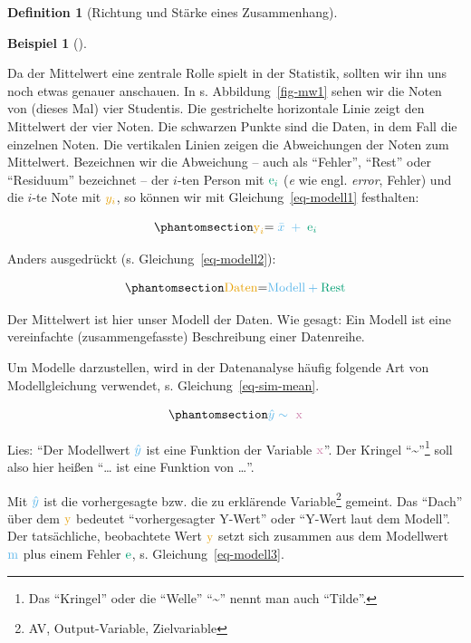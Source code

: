 \documentclass[
  a4paper,
  DIV=11]{scrreprt}
\theoremstyle{definition}
\theoremstyle{definition}
\newtheorem{example}{Beispiel}[chapter]
\theoremstyle{definition}
\newtheorem{definition}{Definition}[chapter]
\theoremstyle{remark}
\begin{document}
\begin{definition}[Richtung und Stärke eines
Zusammenhang]
\begin{example}[]
\end{example}

Da der Mittelwert eine zentrale Rolle spielt in der Statistik, sollten
wir ihn uns noch etwas genauer anschauen. In s. Abbildung~\ref{fig-mw1}
sehen wir die Noten von (dieses Mal) vier Studentis. Die gestrichelte
horizontale Linie zeigt den Mittelwert der vier Noten. Die schwarzen
Punkte sind die Daten, in dem Fall die einzelnen Noten. Die vertikalen
Linien zeigen die Abweichungen der Noten zum Mittelwert. Bezeichnen wir
die Abweichung -- auch als ``Fehler'', ``Rest'' oder ``Residuum''
bezeichnet -- der \(i\)-ten Person mit \(\color{errorcol}{\text{e}_i}\)
(\emph{e} wie engl. \emph{error}, Fehler) und die \(i\)-te Note mit
\(\color{ycol}{y_i}\), so können wir mit Gleichung~\ref{eq-modell1}
festhalten:

\begin{equation}\phantomsection\label{eq-modell1}{\color{ycol}{\text{y}_i} \color{black}{ = } \color{modelcol}{\;\bar{x}\;} + \color{errorcol}{\;\text{e}_i}}\end{equation}

Anders ausgedrückt (s. Gleichung~\ref{eq-modell2}):

\begin{equation}\phantomsection\label{eq-modell2}{\color{ycol}{\text{Daten}} \color{black}{ = }     \color{modelcol}{\text{Modell}} + 
\color{errorcol}{\text{Rest}}}\end{equation}

Der Mittelwert ist hier unser Modell der Daten. Wie gesagt: Ein Modell
ist eine vereinfachte (zusammengefasste) Beschreibung einer Datenreihe.

Um Modelle darzustellen, wird in der Datenanalyse häufig folgende Art
von Modellgleichung verwendet, s. Gleichung~\ref{eq-sim-mean}.

\begin{equation}\phantomsection\label{eq-sim-mean}{\color{modelcol}{\hat{y}} \sim \color{xcol}{\text{ x}}}\end{equation}

Lies: ``Der Modellwert \(\color{modelcol}{\hat{y}}\) ist eine Funktion
der Variable \(\color{xcol}{\text{x}}\)''. Der Kringel
``\textasciitilde{}''\footnote{Das ``Kringel'' oder die ``Welle''
  ``\textasciitilde{}'' nennt man auch ``Tilde''.} soll also hier heißen
``\ldots{} ist eine Funktion von \ldots{}''.

Mit \(\color{modelcol}{\hat{y}}\) ist die vorhergesagte bzw. die zu
erklärende Variable\footnote{AV, Output-Variable, Zielvariable} gemeint.
Das ``Dach'' über dem \(\color{ycol}{\text{y}}\) bedeutet
``vorhergesagter Y-Wert'' oder ``Y-Wert laut dem Modell''. Der
tatsächliche, beobachtete Wert \(\color{ycol}{\text{y}}\) setzt sich
zusammen aus dem Modellwert \(\color{modelcol}{\text{m}}\) plus einem
Fehler \(\color{errorcol}{\text{e}}\), s. Gleichung~\ref{eq-modell3}.


\end{definition}
\end{document}
